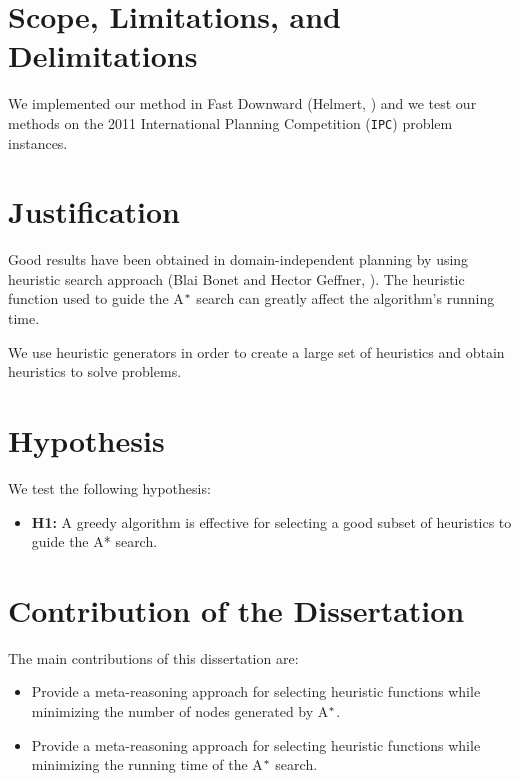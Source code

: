 \section{Scope, Limitations, and Delimitations}
\noindent
We implemented our method in Fast Downward (Helmert, \citeyear{helmert2006fast}) and we test our methods on the 2011 International Planning Competition (\texttt{IPC}) problem instances.

\section{Justification}
\noindent
Good results have been obtained in domain-independent planning by using heuristic search approach (Blai Bonet and Hector Geffner, \citeyear{bonet2001planning}). The heuristic function used to guide the A$\sp{*}$ search can greatly affect the algorithm's running time.

We use heuristic generators in order to create a large set of heuristics and obtain heuristics to solve problems.

\section{Hypothesis}
\noindent
We test the following hypothesis:
\begin{itemize}
\item \textbf{H1:} A greedy algorithm is effective for selecting a good subset of heuristics to guide the A* search.
\end{itemize}

\section{Contribution of the Dissertation}
\noindent
The main contributions of this dissertation are:
\begin{itemize}
\item Provide a meta-reasoning approach for selecting heuristic functions while minimizing the number of nodes generated by A$\sp{*}$.

\item Provide a meta-reasoning approach for selecting heuristic functions while minimizing the running time of the A$\sp{*}$ search. 
\end{itemize}

